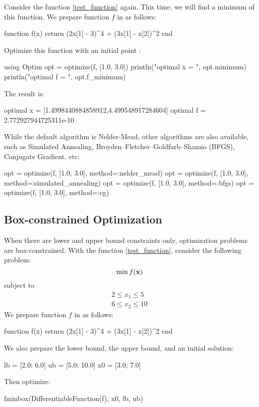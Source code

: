 Consider the function \eqref{test_function} again. This time, we will find a minimum of this function.
We prepare function $f$ in \julia{} as follows:
\begin{code}
function f(x)
    return (2x[1] - 3)^4 + (3x[1] - x[2])^2
end
\end{code}
\noindent Optimize this function with an initial point \kode{[1.0, 3.0]}:
\begin{code}
using Optim
opt = optimize(f, [1.0, 3.0])
println("optimal x = ", opt.minimum)
println("optimal f = ", opt.f_minimum)
\end{code}
\noindent The result is:
\begin{code}
optimal x = [1.4998440884858912,4.499548917284604]
optimal f = 2.772927944725311e-10
\end{code}

While the default algorithm is Nelder-Mead, other algorithms are also available, such as Simulated Annealing, Broyden–Fletcher–Goldfarb–Shanno (BFGS), Conjugate Gradient, etc:
\begin{code}
opt = optimize(f, [1.0, 3.0], method=:nelder_mead)
opt = optimize(f, [1.0, 3.0], method=:simulated_annealing)
opt = optimize(f, [1.0, 3.0], method=:bfgs)
opt = optimize(f, [1.0, 3.0], method=:cg)
\end{code}



\subsection{Box-constrained Optimization}
When there are lower and upper bound constraints only, optimization problems are box-constrained. With the function \eqref{test_function}, consider the following problem:
\begin{equation*}
    \min f(\mathbf{x})
\end{equation*}
subject to
\begin{align*}
    2 \leq x_1 \leq 5 \\
    6 \leq x_2 \leq 10
\end{align*}
We prepare function $f$ in \julia{} as follows:
\begin{code}
function f(x)
    return (2x[1] - 3)^4 + (3x[1] - x[2])^2
end
\end{code}
\noindent We also prepare the lower bound, the upper bound, and an initial solution:
\begin{code}
lb = [2.0; 6.0]
ub = [5.0; 10.0]
x0 = [3.0; 7.0]
\end{code}
\noindent Then optimize:
\begin{code}
fminbox(DifferentiableFunction(f), x0, lb, ub)
\end{code}


